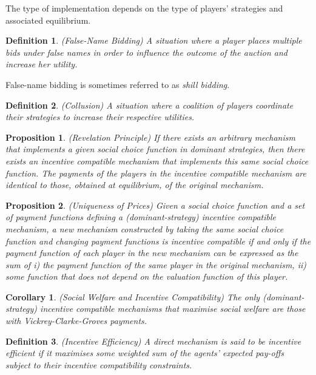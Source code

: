 \documentclass{article}
\newtheorem{proposition}{Proposition}
\newtheorem{definition}{Definition}
\newtheorem{corollary}{Corollary}
\begin{document}
The type of implementation depends on the type of players' strategies and associated equilibrium.

\begin{definition}
(False-Name Bidding) A situation where a player places multiple bids under false names in order to influence the outcome of the auction and increase her utility.
\end{definition}

False-name bidding is sometimes referred to as \textit{shill bidding}.

\begin{definition}
(Collusion) A situation where a coalition of players coordinate their strategies to increase their respective utilities.
\end{definition}

\begin{proposition}
(Revelation Principle) If there exists an arbitrary mechanism that implements a given social choice function in dominant strategies, then there exists an incentive compatible mechanism that implements this same social choice function. The payments of the players in the incentive compatible mechanism are identical to those, obtained at equilibrium, of the original mechanism.
\end{proposition}

\begin{proposition}
(Uniqueness of Prices) Given a social choice function and a set of payment functions defining a (dominant-strategy) incentive compatible mechanism, a new mechanism constructed by taking the same social choice function and changing payment functions is incentive compatible if and only if the payment function of each player in the new mechanism can be expressed as the sum of i) the payment function of the same player in the original mechanism, ii) some function that does not depend on the valuation function of this player.
\end{proposition}

\begin{corollary}
(Social Welfare and Incentive Compatibility) The only (dominant-strategy) incentive compatible mechanisms that maximise social welfare are those with Vickrey-Clarke-Groves payments.
\end{corollary}

\begin{definition}
(Incentive Efficiency) A direct mechanism is said to be incentive efficient if it maximises some weighted sum of the agents' expected pay-offs subject to their incentive compatibility constraints.
\end{definition}
\end{document}
